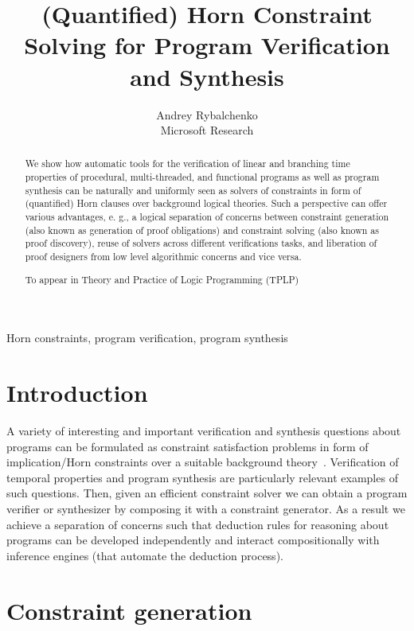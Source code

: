 \documentclass{new_tlp}
\title{(Quantified) Horn Constraint Solving for Program Verification and Synthesis}
\author{Andrey Rybalchenko\\
  Microsoft Research\\
  \email{rybal@microsoft.com}
}
\begin{document}
\maketitle

\begin{abstract}
We show how automatic tools for the verification of linear and branching time properties of procedural, multi-threaded, and functional programs as well as program synthesis can be naturally and uniformly seen as solvers of constraints in form of (quantified) Horn clauses over background logical theories. Such a perspective can offer various advantages, e. g., a logical separation of concerns between constraint generation (also known as generation of proof obligations) and constraint solving (also known as proof discovery), reuse of solvers across different verifications tasks, and liberation of proof designers from low level algorithmic concerns and vice versa.

\noindent
To appear in Theory and Practice of Logic Programming (TPLP)
\end{abstract}

\begin{keywords}
  Horn constraints, program verification, program synthesis
\end{keywords}


\section{Introduction}

A variety of interesting and important verification and synthesis
questions about programs can be formulated as constraint satisfaction
problems in form of implication/Horn constraints over a suitable
background
theory~\cite{ThreaderPOPL2011,ThreaderCAV2011,GrebenshchikovPLDI12,ThreaderTerm12,SMT2012,CinderellaPOPL14}.
Verification of temporal properties and program synthesis are
particularly relevant examples of such questions.
Then, given an efficient constraint solver we can obtain a program
verifier or synthesizer by composing it with a constraint generator. 
As a result we achieve a separation of concerns such that deduction
rules for reasoning about programs can be developed independently and
interact compositionally with inference engines (that automate the
deduction process).

\section{Constraint generation}
\end{document}
